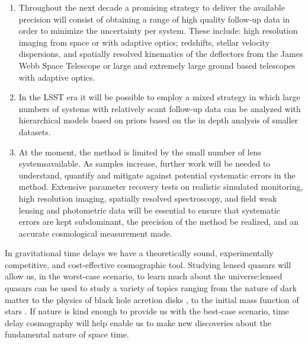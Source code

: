 \begin{enumerate}
%
\item Throughout the next decade a promising strategy to deliver the
available precision will consist of obtaining a range of high quality
follow-up data in order to minimize the uncertainty per system. These
include: high resolution imaging from space or with adaptive optics;
redshifts, stellar velocity dispersions, and spatially resolved
kinematics of the deflectors from the James Webb Space Telescope or
large and extremely large ground based telescopes with adaptive
optics.
%
\item  In the LSST era it will be possible to employ a mixed strategy
in which large numbers of systems with relatively scant follow-up data
can be analyzed with hierarchical models based on priors based on the
in depth analysis of smaller datasets.
%
\item  At the moment, the method is limited by the small number of lens
systemsavailable. As samples increase, further work will be needed to
understand, quantify and mitigate against potential systematic errors
in the method. Extensive parameter recovery tests on realistic
simulated monitoring, high resolution imaging, spatially resolved
spectroscopy, and field weak lensing and photometric data will be
essential to ensure that systematic errors are kept subdominant, the
precision of the method be realized, and an accurate cosmological
measurement made.
\end{enumerate}


In gravitational time delays we have a theoretically sound,
experimentally competitive, and cost-effective cosmographic tool.
Studying lensed
quasars will allow us, in the worst-case scenario, to learn much about
the universe:lensed quasars can be used to study a variety of topics
ranging from the nature of dark matter
\citep{Metcalf:2005p1203,Xu++09,Veg++14,Nie++14} to the physics of
black hole acretion disks \citep{PMK08,Blackburne:2010p6600}, to the
initial mass function of stars \citep{Sch++14}. If nature is kind
enough to provide us with the best-case scenario, time delay cosmography
will
help enable us to
make new discoveries about the fundamental nature of space time.
